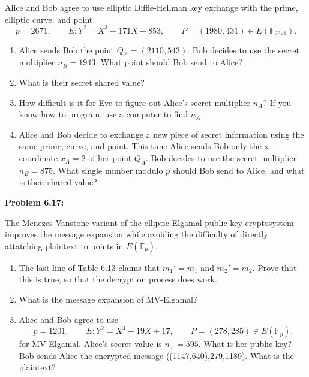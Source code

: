 \documentclass[a4paper, 11pt]{article}
\begin{document}
    Alice and Bob agree to use elliptic Diffie-Hellman key exchange with the prime, elliptic curve, and point 
    $$p=2671, \qquad E:Y^2 = X^3 + 171X + 853, \qquad P=(1980,431)\in E(\mathbb{F}_{2671}).$$
    \begin{enumerate}[label=(\alph*)]
        \item Alice sends Bob the point $Q_A = (2110,543).$ Bob decides to use the secret multiplier $n_B = 1943.$ What point should Bob send to Alice?
        
        
        
        \item What is their secret shared value?
        
        
        
        \item How difficult is it for Eve to figure out Alice's secret multiplier $n_A$? If you know how to program, use a computer to find $n_A$.
        
        
        
        \item Alice and Bob decide to exchange a new piece of secret information using the same prime, curve, and point. This time Alice sends Bob only the x-coordinate $x_A=2$ of her point $Q_A$. Bob decides to use the secret multiplier $n_B=875$. What single number modulo $p$ should Bob send to Alice, and what is their shared value?
        
        
        
    \end{enumerate}
    
\noindent\textbf{Problem 6.17:}
    
    The Menezes-Vanstone variant of the elliptic Elgamal public key cryptosystem improves the message expansion while avoiding the difficulty of directly attatching plaintext to points in $E(\mathbb{F}_p)$.
    \begin{enumerate}[label=(\alph*)]
        \item The last line of Table 6.13 claims that $m_1'=m_1$ and $m_2'=m_2$. Prove that this is true, so that the decryption process does work.
        \item What is the message expansion of MV-Elgamal?
        \item Alice and Bob agree to use
        $$p=1201, \qquad E:Y^2=X^3+19X+17, \qquad P=(278,285)\in E(\mathbb{F}_p ).$$
        for MV-Elgamal. Alice's secret value is $n_A=595$. What is her public key? Bob sends Alice the encrypted message ((1147,640),279,1189). What is the plaintext?
    \end{enumerate}
    
\end{document}
